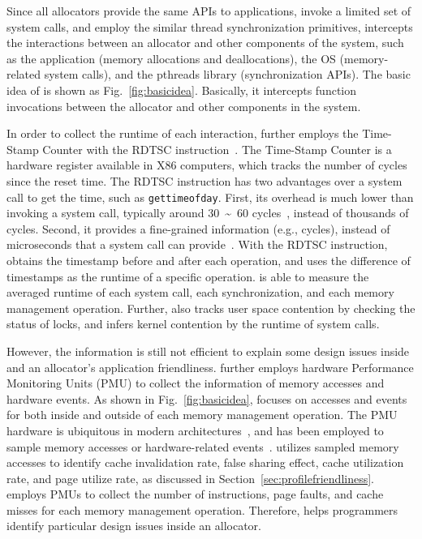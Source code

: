 Since all allocators provide the same APIs to applications, invoke a limited set of system calls, and employ the similar thread synchronization primitives, \MP{} intercepts the interactions between an allocator and other components of the system, such as the application (memory allocations and deallocations), the OS (memory-related system calls), and the pthreads library (synchronization APIs). The basic idea of \MP{} is shown as Fig.~\ref{fig:basicidea}. Basically, it intercepts function invocations between the allocator and other components in the system.
 
In order to collect the runtime of each interaction, \MP{} further employs the Time-Stamp Counter with the RDTSC instruction~\cite{coorporation1997using}. The Time-Stamp Counter is a hardware register available in X86 computers, which tracks the number of cycles since the reset time. The RDTSC instruction has two advantages over a system call to get the time, such as \texttt{gettimeofday}. First, its overhead is much lower than invoking a system call, typically around 30~\textasciitilde~60 cycles~\cite{rdtscoverhead}, instead of thousands of cycles. Second, it provides a fine-grained information (e.g., cycles), instead of microseconds that a system call can provide~\cite{pitfallsrdtsc}. With the RDTSC instruction, \MP{} obtains the timestamp before and after each operation, and uses the difference of timestamps as the runtime of a specific operation. \MP{} is able to measure the averaged runtime of each system call, each synchronization, and each memory management operation. Further, \MP{} also tracks user space contention by checking the status of locks, and infers kernel contention by the runtime of system calls. 

However, the information is still not efficient to explain some design issues inside and an allocator's application friendliness. \MP{} further employs hardware Performance Monitoring Units (PMU) to collect the information of memory accesses and hardware events. As shown in Fig.~\ref{fig:basicidea}, \MP{} focuses on accesses and events for both inside and outside of each memory management operation. The PMU hardware is ubiquitous in modern architectures~\cite{AMDIBS:07, IntelArch:PEBS:Sept09, armpmu}, and has been  employed to sample memory accesses or hardware-related events~\cite{DBLP:conf/sc/ItzkowitzWAK03, ibs-sc, Sheng:2011:RLN:1985793.1985848}.
\MP{} utilizes sampled memory accesses to identify cache invalidation rate, false sharing effect, cache utilization rate, and page utilize rate, as discussed in Section~\ref{sec:profilefriendliness}. \MP{} employs PMUs to collect the number of instructions, page faults, and cache misses for each memory management operation. Therefore, \MP{} helps programmers identify particular design issues inside an allocator. 


